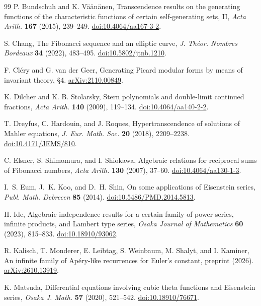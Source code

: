 \documentclass[11pt,a4paper]{article}
\theoremstyle{definition}
\theoremstyle{remark}
\numberwithin{equation}{section}
\begin{document}
\begin{thebibliography}{99}
 P. Bundschuh and K. V\"a\"an\"anen, Transcendence results on the generating functions of the characteristic functions of certain self-generating sets, II, \emph{Acta Arith.} \textbf{167} (2015), 239--249. \href{https://doi.org/10.4064/aa167-3-2}{doi:10.4064/aa167-3-2}.

 S. Chang, The Fibonacci sequence and an elliptic curve, \emph{J. Th\'eor. Nombres Bordeaux} \textbf{34} (2022), 483--495. \href{https://doi.org/10.5802/jtnb.1210}{doi:10.5802/jtnb.1210}.

 F. Cl\'ery and G. van der Geer, Generating Picard modular forms by means of invariant theory, \S4. \href{https://arxiv.org/abs/2110.00849}{arXiv:2110.00849}.

 K. Dilcher and K. B. Stolarsky, Stern polynomials and double-limit continued fractions, \emph{Acta Arith.} \textbf{140} (2009), 119--134. \href{https://doi.org/10.4064/aa140-2-2}{doi:10.4064/aa140-2-2}.

 T. Dreyfus, C. Hardouin, and J. Roques, Hypertranscendence of solutions of Mahler equations, \emph{J. Eur. Math. Soc.} \textbf{20} (2018), 2209--2238. \href{https://doi.org/10.4171/JEMS/810}{doi:10.4171/JEMS/810}.

 C. Elsner, S. Shimomura, and I. Shiokawa, Algebraic relations for reciprocal sums of Fibonacci numbers, \emph{Acta Arith.} \textbf{130} (2007), 37--60. \href{https://doi.org/10.4064/aa130-1-3}{doi:10.4064/aa130-1-3}.

 I.~S. Eum, J.~K. Koo, and D.~H. Shin, On some applications of Eisenstein series, \emph{Publ. Math. Debrecen} \textbf{85} (2014). \href{https://doi.org/10.5486/PMD.2014.5813}{doi:10.5486/PMD.2014.5813}.

 H. Ide, Algebraic independence results for a certain family of power series, infinite products, and Lambert type series, \textit{Osaka Journal of Mathematics} \textbf{60} (2023), 815--833. \href{https://doi.org/10.18910/93062}{doi:10.18910/93062}.

 R. Kalisch, T. Monderer, E. Leibtag, S. Weinbaum, M. Shalyt, and I. Kaminer, An infinite family of Ap\'ery-like recurrences for Euler's constant, preprint (2026). \href{https://arxiv.org/abs/2610.13919}{arXiv:2610.13919}.

 K. Matsuda, Differential equations involving cubic theta functions and Eisenstein series, \emph{Osaka J. Math.} \textbf{57} (2020), 521--542. \href{https://doi.org/10.18910/76671}{doi:10.18910/76671}.


\end{thebibliography}
\end{document}
